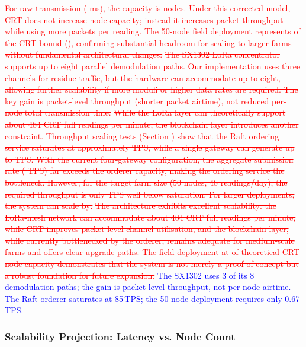 \documentclass[pdflatex,sn-mathphys-num]{sn-jnl}
\theoremstyle{thmstyleone}
\theoremstyle{thmstyletwo}
\theoremstyle{thmstylethree}
\begin{document}
{\textcolor{red}{\sout{For raw transmission ( ms), the capacity is nodes. Under this corrected model, CRT does not increase node capacity; instead it increases packet throughput while using more packets per reading. The 50‑node field deployment represents of the CRT bound (), confirming substantial headroom for scaling to larger farms without fundamental architectural changes.}}
\textcolor{red}{\sout{The SX1302 LoRa concentrator supports up to eight parallel demodulation paths. Our implementation uses three channels for residue traffic, but the hardware can accommodate up to eight, allowing further scalability if more moduli or higher data rates are required. The key gain is packet-level throughput (shorter packet airtime), not reduced per-node total transmission time.}}
\textcolor{red}{\sout{While the LoRa layer can theoretically support about 484 CRT full readings per minute, the blockchain layer introduces another constraint. Throughput scaling tests (Section ) show that the Raft ordering service saturates at approximately TPS, while a single gateway can generate up to TPS. With the current four‑gateway configuration, the aggregate submission rate ( TPS) far exceeds the orderer capacity, making the ordering service the bottleneck. However, for the target farm size (50 nodes, 48 readings/day), the required throughput is only TPS well below saturation. For larger deployments, the system can scale by:}}
\textcolor{red}{\sout{The architecture exhibits excellent scalability: the LoRa‑mesh network can accommodate about 484 CRT full readings per minute, while CRT improves packet-level channel utilisation, and the blockchain layer, while currently bottlenecked by the orderer, remains adequate for medium‑scale farms and offers clear upgrade paths. The field deployment at of theoretical CRT node capacity demonstrates that the system is not merely a proof‑of‑concept but a robust foundation for future expansion.}}
\textcolor{blue}{The SX1302 uses 3 of its 8 demodulation paths; the gain is packet-level throughput, not per-node airtime. The Raft orderer saturates at 85\,TPS; the 50-node deployment requires only 0.67\,TPS.}

\subsubsection{Scalability Projection: Latency vs. Node Count}
\label{subsubsec:scalability_projection}

}
\end{document}
